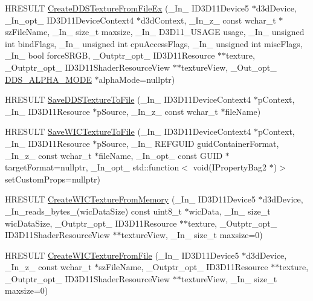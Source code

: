 \begin{DoxyCompactItemize}
\item 
H\+R\+E\+S\+U\+LT \hyperlink{namespace_direct_x_a6dcaa5388f890a8a6a975c21c757636e}{Create\+D\+D\+S\+Texture\+From\+File\+Ex} (\+\_\+\+In\+\_\+ I\+D3\+D11\+Device5 $\ast$d3d\+Device, \+\_\+\+In\+\_\+opt\+\_\+ I\+D3\+D11\+Device\+Context4 $\ast$d3d\+Context, \+\_\+\+In\+\_\+z\+\_\+ const wchar\+\_\+t $\ast$sz\+File\+Name, \+\_\+\+In\+\_\+ size\+\_\+t maxsize, \+\_\+\+In\+\_\+ D3\+D11\+\_\+\+U\+S\+A\+GE usage, \+\_\+\+In\+\_\+ unsigned int bind\+Flags, \+\_\+\+In\+\_\+ unsigned int cpu\+Access\+Flags, \+\_\+\+In\+\_\+ unsigned int misc\+Flags, \+\_\+\+In\+\_\+ bool force\+S\+R\+GB, \+\_\+\+Outptr\+\_\+opt\+\_\+ I\+D3\+D11\+Resource $\ast$$\ast$texture, \+\_\+\+Outptr\+\_\+opt\+\_\+ I\+D3\+D11\+Shader\+Resource\+View $\ast$$\ast$texture\+View, \+\_\+\+Out\+\_\+opt\+\_\+ \hyperlink{namespace_direct_x_a7cb48689d75471680c0bf7f79caaaf1f}{D\+D\+S\+\_\+\+A\+L\+P\+H\+A\+\_\+\+M\+O\+DE} $\ast$alpha\+Mode=nullptr)
\item 
H\+R\+E\+S\+U\+LT \hyperlink{namespace_direct_x_aa35ca8eb36a5eaa3bdbe2f8ef6f27f53}{Save\+D\+D\+S\+Texture\+To\+File} (\+\_\+\+In\+\_\+ I\+D3\+D11\+Device\+Context4 $\ast$p\+Context, \+\_\+\+In\+\_\+ I\+D3\+D11\+Resource $\ast$p\+Source, \+\_\+\+In\+\_\+z\+\_\+ const wchar\+\_\+t $\ast$file\+Name)
\item 
H\+R\+E\+S\+U\+LT \hyperlink{namespace_direct_x_a157ed8633552961221d0c4f953799522}{Save\+W\+I\+C\+Texture\+To\+File} (\+\_\+\+In\+\_\+ I\+D3\+D11\+Device\+Context4 $\ast$p\+Context, \+\_\+\+In\+\_\+ I\+D3\+D11\+Resource $\ast$p\+Source, \+\_\+\+In\+\_\+ R\+E\+F\+G\+U\+ID guid\+Container\+Format, \+\_\+\+In\+\_\+z\+\_\+ const wchar\+\_\+t $\ast$file\+Name, \+\_\+\+In\+\_\+opt\+\_\+ const G\+U\+ID $\ast$target\+Format=nullptr, \+\_\+\+In\+\_\+opt\+\_\+ std\+::function$<$ void(I\+Property\+Bag2 $\ast$)$>$ set\+Custom\+Props=nullptr)
\item 
H\+R\+E\+S\+U\+LT \hyperlink{namespace_direct_x_a096cf236074212664cd69a5224b17baf}{Create\+W\+I\+C\+Texture\+From\+Memory} (\+\_\+\+In\+\_\+ I\+D3\+D11\+Device5 $\ast$d3d\+Device, \+\_\+\+In\+\_\+reads\+\_\+bytes\+\_\+(wic\+Data\+Size) const uint8\+\_\+t $\ast$wic\+Data, \+\_\+\+In\+\_\+ size\+\_\+t wic\+Data\+Size, \+\_\+\+Outptr\+\_\+opt\+\_\+ I\+D3\+D11\+Resource $\ast$$\ast$texture, \+\_\+\+Outptr\+\_\+opt\+\_\+ I\+D3\+D11\+Shader\+Resource\+View $\ast$$\ast$texture\+View, \+\_\+\+In\+\_\+ size\+\_\+t maxsize=0)
\item 
H\+R\+E\+S\+U\+LT \hyperlink{namespace_direct_x_aebd5a0a45a8aac41f02f5879c5f15fa6}{Create\+W\+I\+C\+Texture\+From\+File} (\+\_\+\+In\+\_\+ I\+D3\+D11\+Device5 $\ast$d3d\+Device, \+\_\+\+In\+\_\+z\+\_\+ const wchar\+\_\+t $\ast$sz\+File\+Name, \+\_\+\+Outptr\+\_\+opt\+\_\+ I\+D3\+D11\+Resource $\ast$$\ast$texture, \+\_\+\+Outptr\+\_\+opt\+\_\+ I\+D3\+D11\+Shader\+Resource\+View $\ast$$\ast$texture\+View, \+\_\+\+In\+\_\+ size\+\_\+t maxsize=0)

\end{DoxyCompactItemize}
